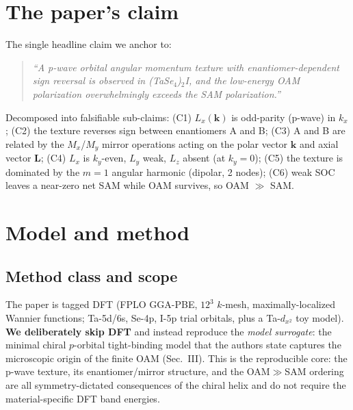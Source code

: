\documentclass[aps,prl,twocolumn,superscriptaddress,floatfix]{revtex4-2}
\begin{document}
\section{The paper's claim}
The single headline claim we anchor to:
\begin{quote}\itshape
``A p-wave orbital angular momentum texture with enantiomer-dependent sign
reversal is observed in (TaSe$_4$)$_2$I, and the low-energy OAM polarization
overwhelmingly exceeds the SAM polarization.''
\end{quote}
Decomposed into falsifiable sub-claims: (C1) $L_x(\bm{k})$ is odd-parity
(p-wave) in $k_x$; (C2) the texture reverses sign between enantiomers A and B;
(C3) A and B are related by the $M_x$/$M_y$ mirror operations acting on the
polar vector $\bm{k}$ and axial vector $\bm{L}$; (C4) $L_x$ is $k_y$-even, $L_y$
weak, $L_z$ absent (at $k_y=0$); (C5) the texture is dominated by the $m=1$
angular harmonic (dipolar, 2 nodes); (C6) weak SOC leaves a near-zero net SAM
while OAM survives, so OAM $\gg$ SAM.

\section{Model and method}
\subsection{Method class and scope}
The paper is tagged DFT (FPLO GGA-PBE, $12^3$ $k$-mesh, maximally-localized
Wannier functions; Ta-5d/6s, Se-4p, I-5p trial orbitals, plus a Ta-$d_{x^2}$
toy model). \textbf{We deliberately skip DFT} and instead reproduce the
\emph{model surrogate}: the minimal chiral $p$-orbital tight-binding model that
the authors state captures the microscopic origin of the finite OAM (Sec.~III).
This is the reproducible core: the p-wave texture, its enantiomer/mirror
structure, and the OAM$\gg$SAM ordering are all symmetry-dictated consequences
of the chiral helix and do not require the material-specific DFT band energies.
\end{document}
